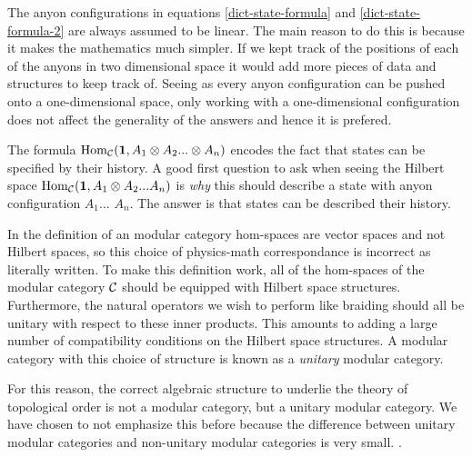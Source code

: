 \begin{rem}
The anyon configurations in equations \ref{dict-state-formula} and \ref{dict-state-formula-2} are always assumed to be linear. The main reason to do this is because it makes the mathematics much simpler. If we kept track of the positions of each of the anyons in two dimensional space it would add more pieces of data and structures to keep track of. Seeing as every anyon configuration can be pushed onto a one-dimensional space, only working with a one-dimensional configuration does not affect the generality of the answers and hence it is prefered.
\end{rem}

\begin{rem} The formula $\operatorname{Hom}_{{\mathcal C}}({\mathbf 1}, A_1\otimes A_2...\otimes A_n)$ encodes the fact that states can be specified by their history. A good first question to ask when seeing the Hilbert space $\operatorname{Hom}_{\mathcal C}({\mathbf 1}, A_1\otimes A_2... A_n)$ is {\em why} this should describe a state with anyon configuration $A_1$... $A_n$. The answer is that states can be described their history. 
\end{rem}

\begin{rem}
In the definition of an modular category hom-spaces are vector spaces and not Hilbert spaces, so this choice of physics-math correspondance is incorrect as literally written. To make this definition work, all of the hom-spaces of the modular category ${\mathcal C}$ should be equipped with Hilbert space structures. Furthermore, the natural operators we wish to perform like braiding should all be unitary with respect to these inner products. This amounts to adding a large number of compatibility conditions on the Hilbert space structures. A modular category with this choice of structure is known as a \textit{unitary} modular category.
\end{rem}

For this reason, the correct algebraic structure to underlie the theory of topological order is not a modular category, but a unitary modular category. We have chosen to not emphasize this before because the difference between unitary modular categories and non-unitary modular categories is very small. .

